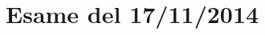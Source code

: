 \documentclass[\main/main.tex]{subfiles}
\begin{document}
\section{Esame del 17/11/2014}

\end{document}
